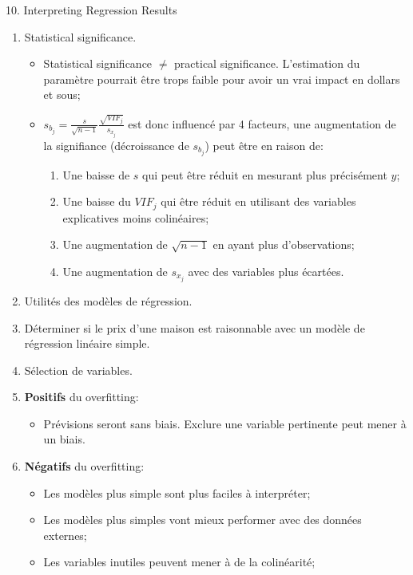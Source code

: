 \documentclass[12pt, titlepage, french]{report}
\begin{document}
\begin{CHPT_SUMM}{10. Interpreting Regression Results}
\begin{enumerate}
	\item	Statistical significance.
	\begin{itemize}
		\item	Statistical significance $\neq$ practical significance. L'estimation du paramètre pourrait être trops faible pour avoir un vrai impact en dollars et sous;
		\item	$s_{b_{j}} = \frac{s}{\sqrt{n - 1}}\frac{\sqrt{VIF_{j}}}{s_{x_{j}}}$ est donc influencé par 4 facteurs, une augmentation de la signifiance (décroissance de $s_{b_{j}}$) peut être en raison de:
		\begin{enumerate}
			\item	Une baisse de $s$ qui peut être réduit en mesurant plus précisément $y$;
			\item	Une baisse du $VIF_{j}$ qui être réduit en utilisant des variables explicatives moins colinéaires;
			\item	Une augmentation de $\sqrt{n - 1}$ en ayant plus d'observations;
			\item	Une augmentation de $s_{x_{j}}$ avec des variables plus écartées.
		\end{enumerate}
	\end{itemize}
	\item	Utilités des modèles de régression.
	\item[]	Déterminer si le prix d'une maison est raisonnable avec un modèle de régression linéaire simple.
	\item	Sélection de variables.
	\item[]	\textbf{Positifs} du overfitting:
	\begin{itemize}
		\item	Prévisions seront sans biais. Exclure une variable pertinente peut mener à un biais.
	\end{itemize}
	\item[]	\textbf{Négatifs} du overfitting:
	\begin{itemize}
		\item	Les modèles plus simple sont plus faciles à interpréter;
		\item	Les modèles plus simples vont mieux performer avec des données externes;
		\item	Les variables inutiles peuvent mener à de la colinéarité;
	\end{itemize}

\end{enumerate}
\end{CHPT_SUMM}
\end{document}
